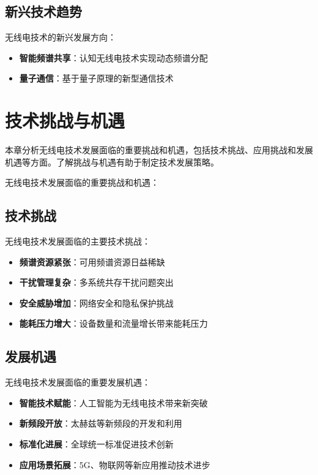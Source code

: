 \documentclass[12pt,UTF8]{ctexbook}
\begin{document}
\section{新兴技术趋势}

无线电技术的新兴发展方向：

\begin{itemize}[leftmargin=3.5em]
    \item \textbf{智能频谱共享}：认知无线电技术实现动态频谱分配
    \item \textbf{量子通信}：基于量子原理的新型通信技术
\end{itemize}

\chapter{技术挑战与机遇}

本章分析无线电技术发展面临的重要挑战和机遇，包括技术挑战、应用挑战和发展机遇等方面。了解挑战与机遇有助于制定技术发展策略。

无线电技术发展面临的重要挑战和机遇：

\section{技术挑战}

无线电技术发展面临的主要技术挑战：

\begin{itemize}[leftmargin=3.5em]
    \item \textbf{频谱资源紧张}：可用频谱资源日益稀缺
    \item \textbf{干扰管理复杂}：多系统共存干扰问题突出
    \item \textbf{安全威胁增加}：网络安全和隐私保护挑战
    \item \textbf{能耗压力增大}：设备数量和流量增长带来能耗压力
\end{itemize}

\section{发展机遇}

无线电技术发展面临的重要发展机遇：

\begin{itemize}[leftmargin=3.5em]
    \item \textbf{智能技术赋能}：人工智能为无线电技术带来新突破
    \item \textbf{新频段开放}：太赫兹等新频段的开发和利用
    \item \textbf{标准化进展}：全球统一标准促进技术创新
    \item \textbf{应用场景拓展}：5G、物联网等新应用推动技术进步
\end{itemize}
\end{document}
